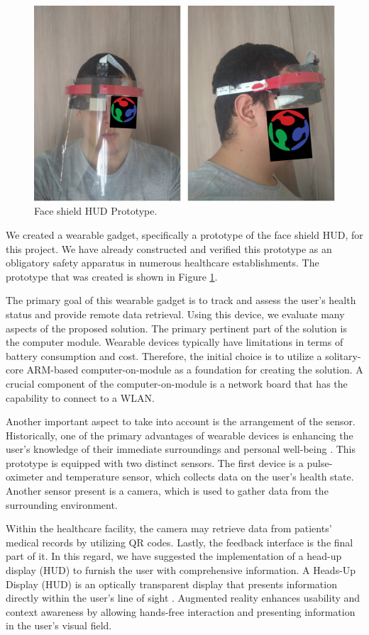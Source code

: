 \begin{figure}[h!]
    \centering
    \includegraphics[width = .6\linewidth]{Figures/facecensor.png}
    \caption{Face shield HUD Prototype.}
    \label{fig:fsproto}
\end{figure}

We created a wearable gadget, specifically a prototype of the face shield HUD, for this project. We have already constructed and verified this prototype \cite{iceis21faceshield} as an obligatory safety apparatus in numerous healthcare establishments. The prototype that was created is shown in Figure \ref{fig:fsproto}.

The primary goal of this wearable gadget is to track and assess the user's health status and provide remote data retrieval. Using this device, we evaluate many aspects of the proposed solution. The primary pertinent part of the solution is the computer module. Wearable devices typically have limitations in terms of battery consumption and cost. Therefore, the initial choice is to utilize a solitary-core ARM-based computer-on-module as a foundation for creating the solution. A crucial component of the computer-on-module is a network board that has the capability to connect to a WLAN.

Another important aspect to take into account is the arrangement of the sensor. Historically, one of the primary advantages of wearable devices is enhancing the user's knowledge of their immediate surroundings and personal well-being \cite{majumder2017wearable}. This prototype is equipped with two distinct sensors. The first device is a pulse-oximeter and temperature sensor, which collects data on the user's health state. Another sensor present is a camera, which is used to gather data from the surrounding environment. 

Within the healthcare facility, the camera may retrieve data from patients' medical records by utilizing QR codes. Lastly, the feedback interface is the final part of it. In this regard, we have suggested the implementation of a head-up display (HUD) to furnish the user with comprehensive information. A Heads-Up Display (HUD) is an optically transparent display that presents information directly within the user's line of sight \cite{betancur2018research}. Augmented reality enhances usability and context awareness by allowing hands-free interaction and presenting information in the user's visual field.


